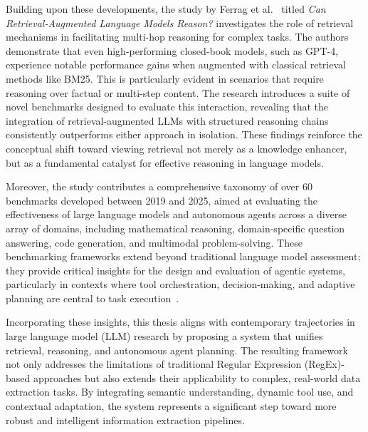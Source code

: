 Building upon these developments, the study by Ferrag et al.~\cite{ferrag2025can} titled \textit{Can Retrieval-Augmented Language Models Reason?} investigates the role of retrieval mechanisms in facilitating multi-hop reasoning for complex tasks. The authors demonstrate that even high-performing closed-book models, such as GPT-4, experience notable performance gains when augmented with classical retrieval methods like BM25. This is particularly evident in scenarios that require reasoning over factual or multi-step content. The research introduces a suite of novel benchmarks designed to evaluate this interaction, revealing that the integration of retrieval-augmented LLMs with structured reasoning chains consistently outperforms either approach in isolation. These findings reinforce the conceptual shift toward viewing retrieval not merely as a knowledge enhancer, but as a fundamental catalyst for effective reasoning in language models.

\vspace{0.5cm}

Moreover, the study contributes a comprehensive taxonomy of over 60 benchmarks developed between 2019 and 2025, aimed at evaluating the effectiveness of large language models and autonomous agents across a diverse array of domains, including mathematical reasoning, domain-specific question answering, code generation, and multimodal problem-solving. These benchmarking frameworks extend beyond traditional language model assessment; they provide critical insights for the design and evaluation of agentic systems, particularly in contexts where tool orchestration, decision-making, and adaptive planning are central to task execution~\cite{ferrag2025can}.

\vspace{0.5cm}

Incorporating these insights, this thesis aligns with contemporary trajectories in large language model (LLM) research by proposing a system that unifies retrieval, reasoning, and autonomous agent planning. The resulting framework not only addresses the limitations of traditional Regular Expression (RegEx)-based approaches but also extends their applicability to complex, real-world data extraction tasks. By integrating semantic understanding, dynamic tool use, and contextual adaptation, the system represents a significant step toward more robust and intelligent information extraction pipelines.

\vspace{0.5cm}

